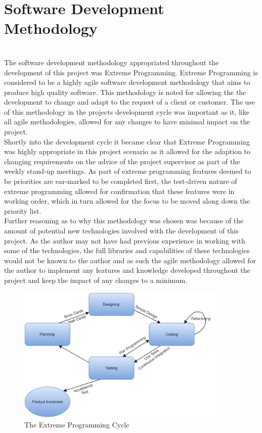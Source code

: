 \section{Software Development Methodology} \\
The software development methodology appropriated throughout the development of this project was Extreme Programming\cite{agile}. Extreme Programming is considered to be a highly agile software development methodology that aims to produce high quality software. This methodology is noted for allowing the the development to change and adapt to the request of a client or customer. The use of this methodology in the projects development cycle was important as it, like all agile methodologies, allowed for any changes to have minimal impact on the project. \\
Shortly into the development cycle it became clear that Extreme Programming was highly appropriate in this project scenario as it allowed for the adaption to changing requirements on the advice of the project supervisor as part of the weekly stand-up meetings. As part of extreme programming features deemed to be priorities are ear-marked to be completed first, the test-driven nature of extreme programming allowed for confirmation that these features were in working order, which in turn allowed for the focus to be moved along down the priority list. \\
Further reasoning as to why this methodology was chosen was because of the amount of potential new technologies involved with the development of this project. As the author may not have had previous experience in working with some of the technologies, the full libraries and capabilities of these technologies would not be known to the author and as such the agile methodology allowed for the author to implement any features and knowledge developed throughout the project and keep the impact of any changes to a minimum. \\

\begin{figure}[h!]
	\caption{The Extreme Programming Cycle}
	\centering
	\includegraphics[width=0.9\textwidth]{images/xp}
\end{figure}

